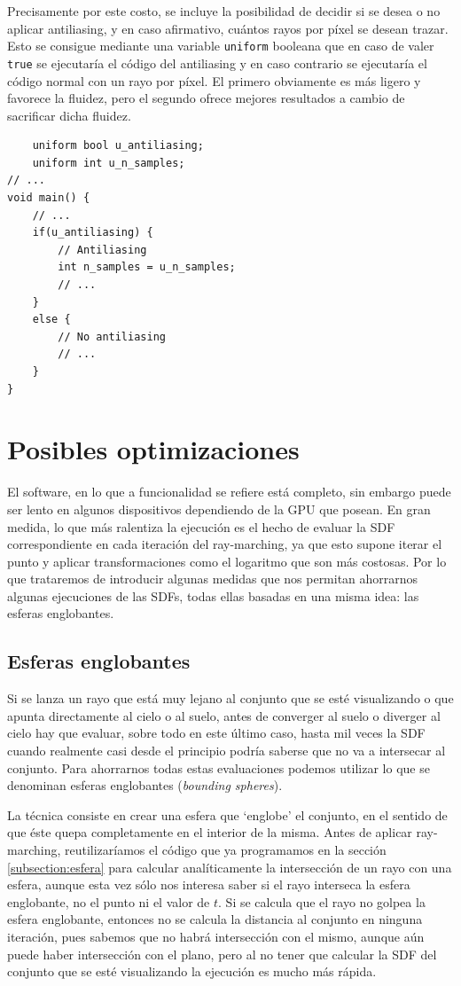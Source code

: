 Precisamente por este costo, se incluye la posibilidad de decidir si se desea o no aplicar antiliasing, y en caso afirmativo, cuántos rayos por píxel se desean trazar. Esto se consigue mediante una variable \verb|uniform| booleana que en caso de valer \verb|true| se ejecutaría el código del antiliasing y en caso contrario se ejecutaría el código normal con un rayo por píxel. El primero obviamente es más ligero y favorece la fluidez, pero el segundo ofrece mejores resultados a cambio de sacrificar dicha fluidez.

\begin{lstlisting}
    uniform bool u_antiliasing;
    uniform int u_n_samples;
// ...
void main() {
    // ... 
    if(u_antiliasing) {
        // Antiliasing
        int n_samples = u_n_samples;
        // ... 
    }
    else {
        // No antiliasing
        // ...
    }
}   
\end{lstlisting}

\section{Posibles optimizaciones}

El software, en lo que a funcionalidad se refiere está completo, sin embargo puede ser lento en algunos dispositivos dependiendo de la GPU que posean. En gran medida, lo que más ralentiza la ejecución es el hecho de evaluar la SDF correspondiente en cada iteración del ray-marching, ya que esto supone iterar el punto y aplicar transformaciones como el logaritmo que son más costosas. Por lo que trataremos de introducir algunas medidas que nos permitan ahorrarnos algunas ejecuciones de las SDFs, todas ellas basadas en una misma idea: las esferas englobantes.

\subsection{Esferas englobantes}
 
Si se lanza un rayo que está muy lejano al conjunto que se esté visualizando o que apunta directamente al cielo o al suelo, antes de converger al suelo o diverger al cielo hay que evaluar, sobre todo en este último caso, hasta mil veces la SDF cuando realmente casi desde el principio podría saberse que no va a intersecar al conjunto. Para ahorrarnos todas estas evaluaciones podemos utilizar lo que se denominan esferas englobantes (\textit{bounding spheres}).

La técnica consiste en crear una esfera que `englobe' el conjunto, en el sentido de que éste quepa completamente en el interior de la misma. Antes de aplicar ray-marching, reutilizaríamos el código que ya programamos en la sección \ref{subsection:esfera} para calcular analíticamente la intersección de un rayo con una esfera, aunque esta vez sólo nos interesa saber si el rayo interseca la esfera englobante, no el punto ni el valor de $t$. Si se calcula que el rayo no golpea la esfera englobante, entonces no se calcula la distancia al conjunto en ninguna iteración, pues sabemos que no habrá intersección con el mismo, aunque aún puede haber intersección con el plano, pero al no tener que calcular la SDF del conjunto que se esté visualizando la ejecución es mucho más rápida.

